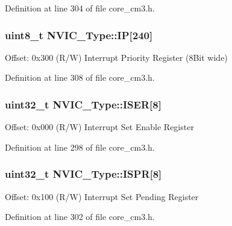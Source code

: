 Definition at line 304 of file core\+\_\+cm3.\+h.

\subsubsection[{\texorpdfstring{IP}{IP}}]{ uint8\+\_\+t N\+V\+I\+C\+\_\+\+Type\+::\+IP\mbox{[}240\mbox{]}}\hypertarget{structNVIC__Type_a6524789fedb94623822c3e0a47f3d06c}{}\label{structNVIC__Type_a6524789fedb94623822c3e0a47f3d06c}
Offset\+: 0x300 (R/W) Interrupt Priority Register (8\+Bit wide) 

Definition at line 308 of file core\+\_\+cm3.\+h.

\subsubsection[{\texorpdfstring{I\+S\+ER}{ISER}}]{ uint32\+\_\+t N\+V\+I\+C\+\_\+\+Type\+::\+I\+S\+ER\mbox{[}8\mbox{]}}\hypertarget{structNVIC__Type_af90c80b7c2b48e248780b3781e0df80f}{}\label{structNVIC__Type_af90c80b7c2b48e248780b3781e0df80f}
Offset\+: 0x000 (R/W) Interrupt Set Enable Register 

Definition at line 298 of file core\+\_\+cm3.\+h.

\subsubsection[{\texorpdfstring{I\+S\+PR}{ISPR}}]{ uint32\+\_\+t N\+V\+I\+C\+\_\+\+Type\+::\+I\+S\+PR\mbox{[}8\mbox{]}}\hypertarget{structNVIC__Type_acf8e38fc2e97316242ddeb7ea959ab90}{}\label{structNVIC__Type_acf8e38fc2e97316242ddeb7ea959ab90}
Offset\+: 0x100 (R/W) Interrupt Set Pending Register 

Definition at line 302 of file core\+\_\+cm3.\+h.

